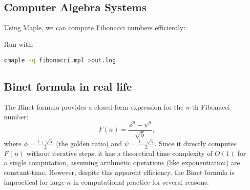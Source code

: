 \documentclass{article}
\begin{document}
\subsection{Computer Algebra Systems}
Using Maple, we can compute Fibonacci numbers efficiently:

Run with:
\begin{lstlisting}[language=bash,caption={Running Maple Script}]
cmaple -q fibonacci.mpl >out.log
\end{lstlisting}

\subsection{Binet formula in real life}

The Binet formula provides a closed-form expression for the \(n\)-th Fibonacci number:
\[
F(n) = \frac{\phi^n - \psi^n}{\sqrt{5}},
\]
where \(\phi = \frac{1 + \sqrt{5}}{2}\) (the golden ratio) and \(\psi = \frac{1 - \sqrt{5}}{2}\). Since it directly computes \(F(n)\) without iterative steps, it has a theoretical time complexity of \(O(1)\) for a single computation, assuming arithmetic operations (like exponentiation) are constant-time. However, despite this apparent efficiency, the Binet formula is impractical for large \(n\) in computational practice for several reasons.
\end{document}
